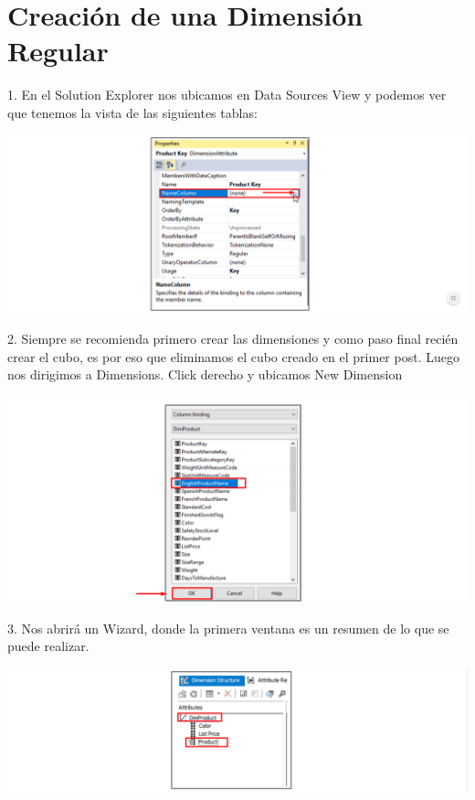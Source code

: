 \section{Creación de una Dimensión Regular}  

1. En el Solution Explorer nos ubicamos en Data Sources View y podemos ver que tenemos la vista de las
siguientes tablas:
	\begin{center}
	\includegraphics[width=\columnwidth]{images/task1/img1}
	\end{center}	


2. Siempre se recomienda primero crear las dimensiones y como paso final recién crear el cubo, es por eso que
eliminamos el cubo creado en el primer post. Luego nos dirigimos a Dimensions. Click derecho y ubicamos
New Dimension
	\begin{center}
	\includegraphics[width=\columnwidth]{images/task1/img2}
	\end{center}	

3. Nos abrirá un Wizard, donde la primera ventana es un resumen de lo que se puede realizar.
	\begin{center}
	\includegraphics[width=\columnwidth]{images/task1/img3}
	\end{center}	

